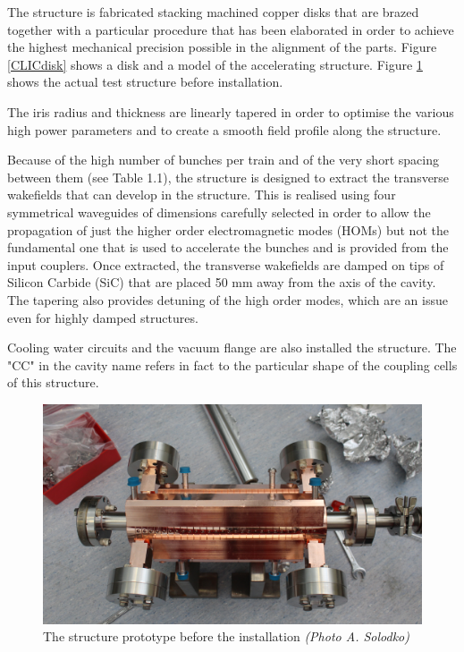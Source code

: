 The structure is fabricated stacking machined copper disks that are brazed together with a particular procedure that has been elaborated in order to achieve the highest mechanical precision possible in the alignment of the parts. Figure \ref{CLICdisk} shows a disk and a model of the accelerating structure. Figure \ref{td26_test_photo} shows the actual test structure before installation.

The iris radius and thickness are linearly tapered in order to optimise the various high power parameters and to create a smooth field profile along the structure. 

Because of the high number of bunches per train and of the very short spacing between them (see Table 1.1), the structure is designed to extract the transverse wakefields that can develop in the structure. This is realised using four symmetrical waveguides of dimensions carefully selected in order to allow the propagation of just the higher order electromagnetic modes (HOMs) but not the fundamental one that is used to accelerate the bunches and is provided from the input couplers. Once extracted, the transverse wakefields are damped on tips of Silicon Carbide (SiC) that are placed 50 mm away from the axis of the cavity.
The tapering also provides detuning of the high order modes, which are an issue even for highly damped structures.

Cooling water circuits and the vacuum flange are also installed the structure. The "CC" in the cavity name refers in fact to the particular shape of the coupling cells of this structure.

\begin{figure}[h]
\centering

\includegraphics[scale=0.16]{pictures/td26_test_photo}
\caption{The structure prototype before the installation \textit{(Photo A. Solodko)}}
\label{td26_test_photo}

\end{figure}


